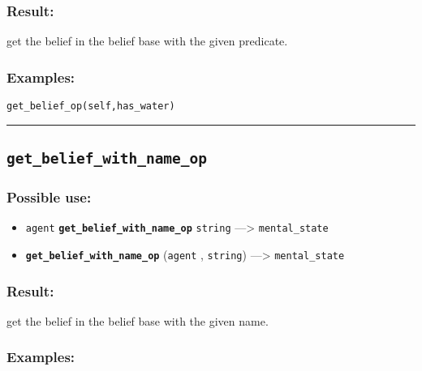 \documentclass[]{book}
\providecommand{\tightlist}{%
  \setlength{\itemsep}{0pt}\setlength{\parskip}{0pt}}
\theoremstyle{definition}
\theoremstyle{definition}
\theoremstyle{definition}
\theoremstyle{remark}
\begin{document}
\subsubsection{Result:}\label{result-191}

get the belief in the belief base with the given predicate.

\subsubsection{Examples:}\label{examples-144}

\begin{verbatim}
get_belief_op(self,has_water) 
\end{verbatim}

\begin{center}\rule{0.5\linewidth}{\linethickness}\end{center}

\subsection{\texorpdfstring{\texttt{get\_belief\_with\_name\_op}}{get\_belief\_with\_name\_op}}\label{get_belief_with_name_op}

\subsubsection{Possible use:}\label{possible-use-198}

\begin{itemize}
\tightlist
\item
  \texttt{agent} \textbf{\texttt{get\_belief\_with\_name\_op}}
  \texttt{string} ---\textgreater{} \texttt{mental\_state}
\item
  \textbf{\texttt{get\_belief\_with\_name\_op}} (\texttt{agent} ,
  \texttt{string}) ---\textgreater{} \texttt{mental\_state}
\end{itemize}

\subsubsection{Result:}\label{result-192}

get the belief in the belief base with the given name.

\subsubsection{Examples:}\label{examples-145}
\end{document}
